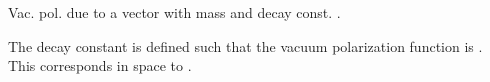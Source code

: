 \documentclass[letterpaper,10pt,english]{sphinxmanual}
\begin{document}
\begin{fulllineitems}
\begin{fulllineitems}
\end{fulllineitems}


\begin{fulllineitems}
\label{\detokenize{g2tools:g2tools.vacpol.vector}}
Vac. pol. due to a vector with mass  and decay const. .

The decay constant is defined such that the vacuum polarization
function is . This
corresponds in  space to .

\end{fulllineitems}


\end{fulllineitems}

\end{document}

